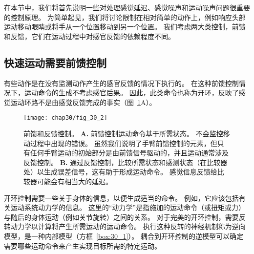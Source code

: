 在本节中，我们将首先说明一些对处理感觉延迟、感觉噪声和运动噪声问题很重要的控制原理。
为简单起见，我们将讨论限制在相对简单的动作上，例如响应头部运动移动眼睛或将手从一个位置移动到另一个位置。
我们考虑两大类控制，前馈和反馈，它们在运动过程中对感官反馈的依赖程度不同。



\subsection{快速运动需要前馈控制}

有些动作是在没有监测动作产生的感官反馈的情况下执行的。
在这种前馈控制情况下，运动命令的生成不考虑感官后果。
因此，此类命令也称为开环，反映了感觉运动环路不是由感觉反馈完成的事实（图~\ref{fig:30_2}A）。


\begin{figure}[htbp]
	\centering
	\texttt{[image: chap30/fig\_30\_2]}
	\caption{前馈和反馈控制。
		\textbf{A.} 前馈控制运动命令基于所需状态。
		不会监控移动过程中出现的错误。
		虽然我们说明了手臂前馈控制的元素，但只有任何手臂运动的初始部分是由前馈信号驱动的，并且运动通常涉及反馈控制。
		\textbf{B.} 通过反馈控制，比较所需状态和感测状态（在比较器处）以生成误差信号，这有助于形成运动命令。
		感觉信息反馈给比较器可能会有相当大的延迟。}
	\label{fig:30_2}
\end{figure}


开环控制需要一些关于身体的信息，以便生成适当的命令。
例如，它应该包括有关运动系统动力学的信息。
这里的“动力学”是指施加的运动命令（或扭矩或力）与随后的身体运动（例如关节旋转）之间的关系。
对于完美的开环控制，需要反转动力学以计算将产生所需运动的运动命令。
执行这种反转的神经机制称为逆向模型，是一种内部模型（方框~\ref{box:30_1}）。
耦合到开环控制的逆模型可以确定需要哪些运动命令来产生实现目标所需的特定运动。


